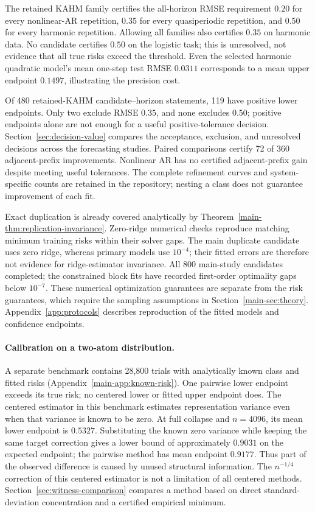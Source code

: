 The retained KAHM family certifies the all-horizon RMSE requirement $0.20$
for every nonlinear-AR repetition, $0.35$ for every quasiperiodic repetition,
and $0.50$ for every harmonic repetition. Allowing all families also certifies
$0.35$ on harmonic data. No candidate certifies $0.50$ on the logistic task;
this is unresolved, not evidence that all true risks exceed the threshold.
Even the selected harmonic quadratic model's mean one-step test RMSE $0.0311$
corresponds to a mean upper endpoint $0.1497$, illustrating the precision cost.

Of 480 retained-KAHM candidate--horizon statements, 119 have positive lower
endpoints. Only two exclude RMSE $0.35$, and none excludes $0.50$; positive
endpoints alone are not enough for a useful positive-tolerance decision.
Section~\ref{sec:decision-value} compares the acceptance, exclusion, and
unresolved decisions across the forecasting studies.
Paired comparisons certify 72 of 360 adjacent-prefix improvements. Nonlinear
AR has no certified adjacent-prefix gain despite meeting useful tolerances.
The complete refinement curves and system-specific counts are retained in
the repository; nesting a class does not guarantee improvement of each fit.

Exact duplication is already covered analytically by
Theorem~\ref{main-thm:replication-invariance}. Zero-ridge numerical checks reproduce
matching minimum training risks within their solver gaps. The main duplicate
candidate uses zero ridge, whereas primary models use $10^{-4}$; their fitted
errors are therefore not evidence for ridge-estimator invariance.
All 800 main-study candidates completed; the constrained block fits have
recorded first-order optimality gaps below $10^{-7}$. These numerical
optimization guarantees are separate from the risk guarantees, which require
the sampling assumptions in Section~\ref{main-sec:theory}. Appendix~\ref{app:protocols}
describes reproduction of the fitted models and confidence endpoints.

\paragraph{Calibration on a two-atom distribution.}
A separate benchmark contains 28,800 trials with analytically known class
and fitted risks (Appendix~\ref{main-app:known-risk}). One pairwise lower endpoint
exceeds its true risk; no centered lower or fitted upper endpoint does.
The centered estimator in this benchmark estimates representation variance
even when that variance is known to be zero. At full collapse and $n=4096$,
its mean lower endpoint is $0.5327$. Substituting the known zero variance while
keeping the same target correction gives a lower bound of approximately
$0.9031$ on the expected endpoint; the pairwise method has mean endpoint $0.9177$. Thus part of the
observed difference is caused by unused structural information. The
$n^{-1/4}$ correction of this centered estimator is not a limitation of all
centered methods. Section~\ref{sec:witness-comparison} compares a method based
on direct standard-deviation concentration and a certified empirical minimum.

